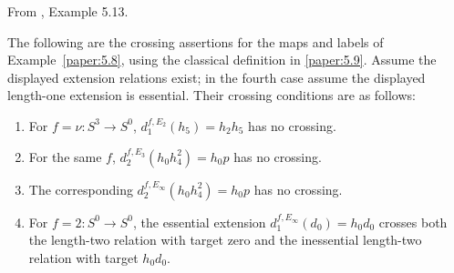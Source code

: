 \begin{proposition}
\label{paper:5.13}
\label{exam:Ercross}
From \cite{LWX126}, Example 5.13.\par
The following are the crossing assertions for the maps and labels of Example~\ref{paper:5.8}, using the classical definition in \ref{paper:5.9}. Assume the displayed extension relations exist; in the fourth case assume the displayed length-one extension is essential. Their crossing conditions are as follows:
\begin{enumerate}
\item For $f=\nu:S^3\to S^0$, $d_1^{f,E_2}(h_5)=h_2h_5$ has no crossing.
\item For the same $f$, $d_2^{f,E_3}(h_0h_4^2)=h_0p$ has no crossing.
\item The corresponding $d_2^{f,E_\infty}(h_0h_4^2)=h_0p$ has no crossing.
\item For $f=2:S^0\to S^0$, the essential extension $d_1^{f,E_\infty}(d_0)=h_0d_0$ crosses both the length-two relation with target zero and the inessential length-two relation with target $h_0d_0$.
\end{enumerate}

\end{proposition}
